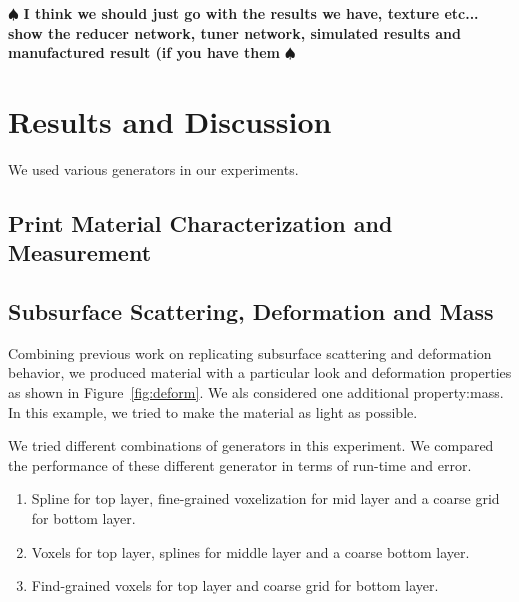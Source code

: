 \documentclass[annual]{acmsiggraph}
\newcommand{\note}[1]{\marginpar{\LARGE $\spadesuit$}
			$\spadesuit$ {\bf #1} $\spadesuit$}
\begin{document}
%
%
%
%

\note{I think we should just go with the results we have, texture etc... show the reducer network, tuner network, simulated results and manufactured result (if you have them}
\section{Results and Discussion}
We used various generators in our experiments.
\subsection{Print Material Characterization and Measurement}
\subsection{Subsurface Scattering, Deformation and Mass}
Combining previous work on replicating
subsurface scattering and deformation behavior, 
we produced
material with a particular
look and deformation properties as shown in Figure~\ref{fig:deform}.
We als considered one additional property:mass. 
In this example, we
tried to make the material as light as possible.

We tried different combinations of generators in this experiment.
We compared the performance of these different generator
in terms of run-time and error.
\begin{enumerate}
\item Spline for top layer, fine-grained voxelization for mid layer
and a coarse grid for bottom layer.
\item Voxels for top layer, splines for middle layer and a coarse
bottom layer.
\item Find-grained voxels for top layer and coarse grid for bottom layer.
\end{enumerate}
\end{document}
